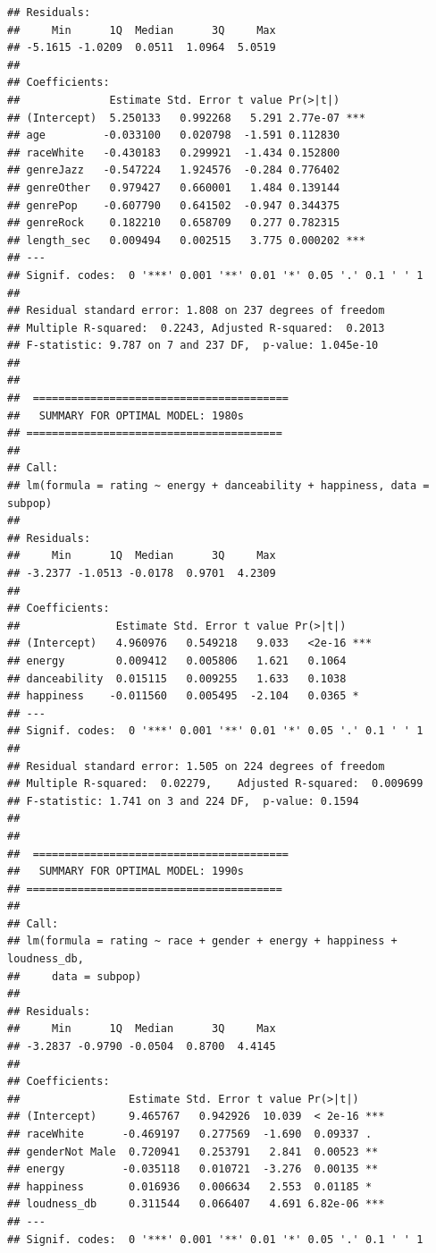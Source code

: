 \documentclass[
]{article}
\begin{document}
\begin{verbatim}
## Residuals:
##     Min      1Q  Median      3Q     Max 
## -5.1615 -1.0209  0.0511  1.0964  5.0519 
## 
## Coefficients:
##              Estimate Std. Error t value Pr(>|t|)    
## (Intercept)  5.250133   0.992268   5.291 2.77e-07 ***
## age         -0.033100   0.020798  -1.591 0.112830    
## raceWhite   -0.430183   0.299921  -1.434 0.152800    
## genreJazz   -0.547224   1.924576  -0.284 0.776402    
## genreOther   0.979427   0.660001   1.484 0.139144    
## genrePop    -0.607790   0.641502  -0.947 0.344375    
## genreRock    0.182210   0.658709   0.277 0.782315    
## length_sec   0.009494   0.002515   3.775 0.000202 ***
## ---
## Signif. codes:  0 '***' 0.001 '**' 0.01 '*' 0.05 '.' 0.1 ' ' 1
## 
## Residual standard error: 1.808 on 237 degrees of freedom
## Multiple R-squared:  0.2243, Adjusted R-squared:  0.2013 
## F-statistic: 9.787 on 7 and 237 DF,  p-value: 1.045e-10
## 
## 
##  ======================================== 
##   SUMMARY FOR OPTIMAL MODEL: 1980s 
## ======================================== 
## 
## Call:
## lm(formula = rating ~ energy + danceability + happiness, data = subpop)
## 
## Residuals:
##     Min      1Q  Median      3Q     Max 
## -3.2377 -1.0513 -0.0178  0.9701  4.2309 
## 
## Coefficients:
##               Estimate Std. Error t value Pr(>|t|)    
## (Intercept)   4.960976   0.549218   9.033   <2e-16 ***
## energy        0.009412   0.005806   1.621   0.1064    
## danceability  0.015115   0.009255   1.633   0.1038    
## happiness    -0.011560   0.005495  -2.104   0.0365 *  
## ---
## Signif. codes:  0 '***' 0.001 '**' 0.01 '*' 0.05 '.' 0.1 ' ' 1
## 
## Residual standard error: 1.505 on 224 degrees of freedom
## Multiple R-squared:  0.02279,    Adjusted R-squared:  0.009699 
## F-statistic: 1.741 on 3 and 224 DF,  p-value: 0.1594
## 
## 
##  ======================================== 
##   SUMMARY FOR OPTIMAL MODEL: 1990s 
## ======================================== 
## 
## Call:
## lm(formula = rating ~ race + gender + energy + happiness + loudness_db, 
##     data = subpop)
## 
## Residuals:
##     Min      1Q  Median      3Q     Max 
## -3.2837 -0.9790 -0.0504  0.8700  4.4145 
## 
## Coefficients:
##                 Estimate Std. Error t value Pr(>|t|)    
## (Intercept)     9.465767   0.942926  10.039  < 2e-16 ***
## raceWhite      -0.469197   0.277569  -1.690  0.09337 .  
## genderNot Male  0.720941   0.253791   2.841  0.00523 ** 
## energy         -0.035118   0.010721  -3.276  0.00135 ** 
## happiness       0.016936   0.006634   2.553  0.01185 *  
## loudness_db     0.311544   0.066407   4.691 6.82e-06 ***
## ---
## Signif. codes:  0 '***' 0.001 '**' 0.01 '*' 0.05 '.' 0.1 ' ' 1

\end{verbatim}
\end{document}
